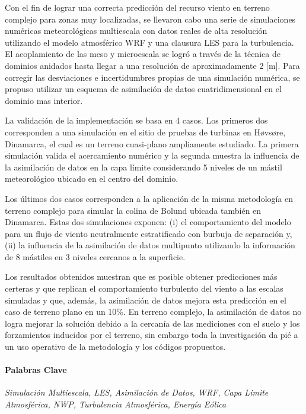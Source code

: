 Con el fin de lograr una correcta predicción del recurso viento en terreno complejo para zonas muy localizadas, se llevaron cabo una serie de simulaciones numéricas meteorológicas multiescala con datos reales de alta resolución utilizando el modelo atmosférico WRF y una clausura LES para la turbulencia.
El acoplamiento de las meso y microescala se logró a través de la técnica de dominios anidados hasta llegar a una resolución de aproximadamente 2 [m]. Para corregir las desviaciones e incertidumbres propias de una simulación numérica, se propuso utilizar un esquema de asimilación de datos cuatridimensional en el dominio mas interior.

La validación de la implementación se basa en 4 casos. Los primeros dos corresponden a una simulación en el sitio de pruebas de turbinas en Høvsøre, Dinamarca, el cual es un terreno cuasi-plano ampliamente estudiado. La primera simulación valida el acercamiento numérico y la segunda muestra la influencia de la asimilación de datos en la capa límite considerando 5 niveles de un mástil meteorológico ubicado en el centro del dominio.

Los últimos dos casos corresponden a la aplicación de la misma metodología en terreno complejo para simular la colina de Bolund ubicada también en Dinamarca. Estas dos simulaciones exponen: (i) el comportamiento del modelo para un flujo de viento neutralmente estratificado con burbuja de separación y, (ii) la influencia de la asimilación de datos multipunto utilizando la información de 8 mástiles en 3 niveles cercanos a la superficie.

Los resultados obtenidos muestran que es posible obtener predicciones más certeras y que replican el comportamiento turbulento del viento a las escalas simuladas y que, además, la asimilación de datos mejora esta predicción en el caso de terreno plano en un 10\%. En terreno complejo, la asimilación de datos no logra mejorar la solución debido a la cercanía de las mediciones con el suelo y los forzamientos inducidos por el terreno, sin embargo toda la investigación da pié a un uso operativo de la metodología y los códigos propuestos.

\paragraph{Palabras Clave} \emph{Simulación Multiescala, LES, Asimilación de Datos, WRF, Capa Limite Atmosférica, NWP, Turbulencia Atmosférica, Energía Eólica}